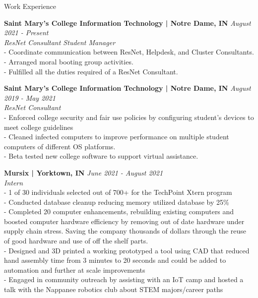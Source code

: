 \documentclass{resume} %
\begin{document}


\begin{rSection}{Work Experience}


{\bf Saint Mary’s College Information Technology | Notre Dame, IN} \hfill {\em August 2021 - Present}
\\{\textit{ResNet Consultant Student Manager}}
\\ - Coordinate communication between ResNet, Helpdesk, and Cluster Consultants.
\\ - Arranged moral booting group activities.
\\ - Fulfilled all the duties required of a ResNet Consultant.

{\bf Saint Mary’s College Information Technology | Notre Dame, IN} \hfill {\em August 2019 - May 2021}
\\{\textit{ResNet Consultant}}
\\ - Enforced college security and fair use policies by configuring student's devices to meet college guidelines
\\ - Cleaned infected computers to improve performance on multiple student computers of different OS platforms.
\\ - Beta tested new college software to support virtual assistance.


{\bf Mursix | Yorktown, IN} \hfill {\em June 2021 - August 2021}
\\{\textit{Intern}}
\\ - 1 of 30 individuals selected out of 700+  for the TechPoint Xtern program
\\ - Conducted database cleanup reducing memory utilized database by 25\%
\\ - Completed 20 computer enhancements, rebuilding existing computers and boosted computer hardware efficiency by removing out of date hardware under supply chain stress. Saving the company thousands of dollars through the reuse of good hardware and use of off the shelf parts.
\\ - Designed and 3D printed a working prototyped a tool using CAD that reduced hand assembly time from 3 minutes to 20 seconds and could be added to automation and further at scale improvements
\\ - Engaged in community outreach by assisting with an IoT camp and hosted a talk with the Nappanee robotics club about STEM majors/career paths


\end{rSection}
\end{document}
